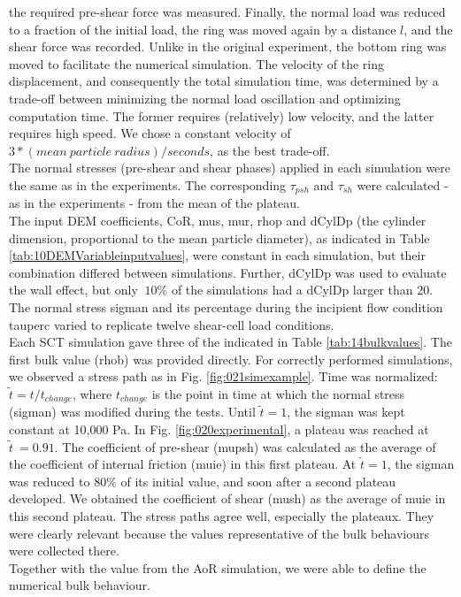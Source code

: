 the required pre-shear force was measured.
Finally, the normal load was reduced to a fraction of the initial load, 
the ring was moved again by a distance $l$, and the shear force was recorded. 
Unlike in the original experiment, the bottom ring was moved to facilitate the numerical simulation. 
The velocity of the ring displacement, and consequently the total simulation time, 
was determined by a trade-off between minimizing the normal load oscillation and
optimizing computation time. 
The former requires (relatively) low velocity, and the latter requires high
speed.
We chose a constant velocity of $3*(mean ~ particle ~ radius)/seconds$, as the
best trade-off.\\
The normal stresses (pre-shear and shear phases) applied in each simulation were
the same as in the experiments.
The corresponding $\tau_{psh}$ and $\tau_{sh}$ were calculated - as in the experiments - from the mean of the plateau.\\
The input \acs{DEM} coefficients, \acs{CoR}, \acs{mus}, \acs{mur},
\acs{rhop} and \acs{dCylDp} (the cylinder dimension, proportional to the mean
particle diameter), as indicated in Table \ref{tab:10DEMVariableinputvalues}, 
were constant in each simulation, but their combination differed between
simulations.
Further, \acs{dCylDp} was used to evaluate the wall effect, but only $~10\%$ of the
simulations had a \acs{dCylDp} larger than $20$.
The normal stress \acs{sigman} and its
percentage during the incipient flow condition \acs{tauperc}
varied to replicate twelve shear-cell load conditions.\\ 

Each \acs{SCT} simulation gave three of the  indicated in
Table \ref{tab:14bulkvalues}.
The first bulk value (\acs{rhob}) was provided directly. 
For correctly performed simulations, we
observed a stress path as in Fig. \ref{fig:021simexample}.
Time was normalized: $\tilde{t} = t/t_{change}$, where $t_{change}$ is the
point in time at which the normal stress (\acs{sigman}) was modified during the
tests.
Until $\tilde{t}=1$, the \acs{sigman} was kept constant at 10,000 Pa.
In Fig. \ref{fig:020experimental},
a plateau was reached at $\tilde{t}~=0.91$.
The coefficient of pre-shear (\acs{mupsh}) was calculated as the average of the
coefficient of internal friction (\acs{muie}) in this first plateau.
At $\tilde{t}=1$, the \acs{sigman} was reduced to $80 \%$ of its initial
value, and soon after
a second plateau developed.
We obtained the coefficient of
shear (\acs{mush}) as the average of \acs{muie} in this second plateau.
The stress paths agree well, especially the plateaux.
They were clearly relevant because
the values representative of the bulk behaviours
were collected there.\\
Together with the value from the \acs{AoR} simulation, we were able to define
the numerical bulk behaviour.


